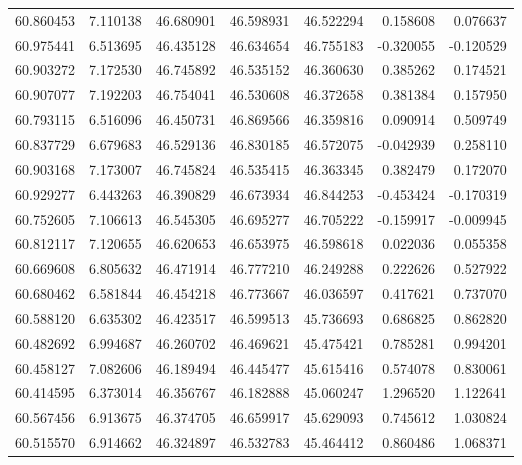 \begin{tabular}{rrrrrrr}
 60.860453 &   7.110138 &         46.680901 &         46.598931 &         46.522294 &  0.158608 &  0.076637 \\
 60.975441 &   6.513695 &         46.435128 &         46.634654 &         46.755183 & -0.320055 & -0.120529 \\
 60.903272 &   7.172530 &         46.745892 &         46.535152 &         46.360630 &  0.385262 &  0.174521 \\
 60.907077 &   7.192203 &         46.754041 &         46.530608 &         46.372658 &  0.381384 &  0.157950 \\
 60.793115 &   6.516096 &         46.450731 &         46.869566 &         46.359816 &  0.090914 &  0.509749 \\
 60.837729 &   6.679683 &         46.529136 &         46.830185 &         46.572075 & -0.042939 &  0.258110 \\
 60.903168 &   7.173007 &         46.745824 &         46.535415 &         46.363345 &  0.382479 &  0.172070 \\
 60.929277 &   6.443263 &         46.390829 &         46.673934 &         46.844253 & -0.453424 & -0.170319 \\
 60.752605 &   7.106613 &         46.545305 &         46.695277 &         46.705222 & -0.159917 & -0.009945 \\
 60.812117 &   7.120655 &         46.620653 &         46.653975 &         46.598618 &  0.022036 &  0.055358 \\
 60.669608 &   6.805632 &         46.471914 &         46.777210 &         46.249288 &  0.222626 &  0.527922 \\
 60.680462 &   6.581844 &         46.454218 &         46.773667 &         46.036597 &  0.417621 &  0.737070 \\
 60.588120 &   6.635302 &         46.423517 &         46.599513 &         45.736693 &  0.686825 &  0.862820 \\
 60.482692 &   6.994687 &         46.260702 &         46.469621 &         45.475421 &  0.785281 &  0.994201 \\
 60.458127 &   7.082606 &         46.189494 &         46.445477 &         45.615416 &  0.574078 &  0.830061 \\
 60.414595 &   6.373014 &         46.356767 &         46.182888 &         45.060247 &  1.296520 &  1.122641 \\
 60.567456 &   6.913675 &         46.374705 &         46.659917 &         45.629093 &  0.745612 &  1.030824 \\
 60.515570 &   6.914662 &         46.324897 &         46.532783 &         45.464412 &  0.860486 &  1.068371 \\

\end{tabular}

